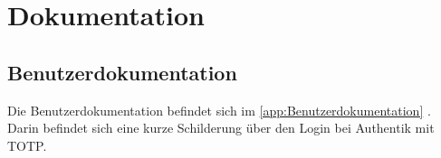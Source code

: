 \section{Dokumentation}
\label{sec:Dokumentation}

\subsection{Benutzerdokumentation}
\label{sec:Benutzerdokumentation}
Die Benutzerdokumentation befindet sich im  \ref{app:Benutzerdokumentation} . Darin 
befindet sich eine kurze Schilderung über den Login bei Authentik mit \acs{TOTP}.
